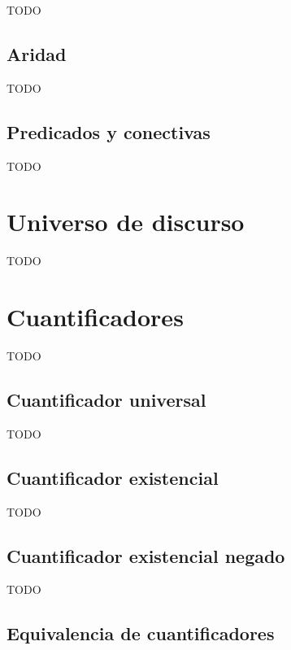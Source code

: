 TODO

\subsection{Aridad}
\label{chap:logica_predicados:subsec:aridad}

TODO

\subsection{Predicados y conectivas}
\label{chap:logica_predicados:subsec:predicados_y_conectivas}

TODO

\section{Universo de discurso}
\label{chap:logica_predicados:sec:universo}

TODO

\section{Cuantificadores}
\label{chap:logica_predicados:sec:cuantificadores}

TODO

\subsection{Cuantificador universal}
\label{chap:logica_predicados:subsec:universal}

TODO

\subsection{Cuantificador existencial}
\label{chap:logica_predicados:subsec:existencial}

TODO

\subsection{Cuantificador existencial negado}
\label{chap:logica_predicados:subsec:existencial_negado}

TODO

\subsection{Equivalencia de cuantificadores}
\label{chap:logica_predicados:subsec:equivalencias}

